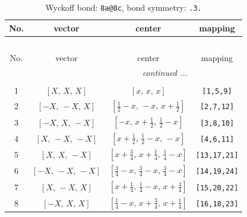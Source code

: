 \documentclass[fleqn,8pt]{jsarticle}
\begin{document}
\begin{longtable}{cccc}
\caption{Wyckoff bond: {\tt 8a@8c}, bond symmetry: {\tt .3.}}
 \\
 \hline \hline
No. & vector & center & mapping \\ \hline \endfirsthead

\multicolumn{3}{l}{\tablename\ \thetable{}} \\
 \hline \hline
No. & vector & center & mapping \\ \hline \endhead

 \hline \hline
\multicolumn{3}{r}{\footnotesize\it continued ...} \\ \endfoot

 \hline \hline
\multicolumn{3}{r}{} \\ \endlastfoot

1 & $\left[ X,\, X,\, X \right]$ & $\left[ x,\, x,\, x \right]$ & {\tt [1,5,9]} \\ \hline
2 & $\left[ - X,\, - X,\, X \right]$ & $\left[ \frac{1}{2} - x,\, - x,\, x + \frac{1}{2} \right]$ & {\tt [2,7,12]} \\ \hline
3 & $\left[ - X,\, X,\, - X \right]$ & $\left[ - x,\, x + \frac{1}{2},\, \frac{1}{2} - x \right]$ & {\tt [3,8,10]} \\ \hline
4 & $\left[ X,\, - X,\, - X \right]$ & $\left[ x + \frac{1}{2},\, \frac{1}{2} - x,\, - x \right]$ & {\tt [4,6,11]} \\ \hline
5 & $\left[ X,\, X,\, - X \right]$ & $\left[ x + \frac{3}{4},\, x + \frac{1}{4},\, \frac{1}{4} - x \right]$ & {\tt [13,17,21]} \\ \hline
6 & $\left[ - X,\, - X,\, - X \right]$ & $\left[ \frac{3}{4} - x,\, \frac{3}{4} - x,\, \frac{3}{4} - x \right]$ & {\tt [14,19,24]} \\ \hline
7 & $\left[ X,\, - X,\, X \right]$ & $\left[ x + \frac{1}{4},\, \frac{1}{4} - x,\, x + \frac{3}{4} \right]$ & {\tt [15,20,22]} \\ \hline
8 & $\left[ - X,\, X,\, X \right]$ & $\left[ \frac{1}{4} - x,\, x + \frac{3}{4},\, x + \frac{1}{4} \right]$ & {\tt [16,18,23]} \\
\end{longtable}
\renewcommand{\arraystretch}{1.2}
\end{document}

